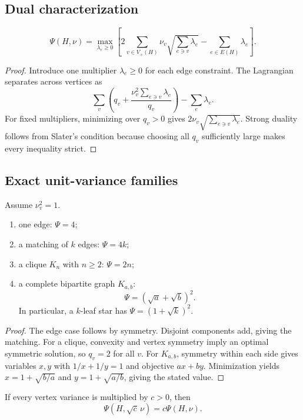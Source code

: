 \subsection{Dual characterization}

\begin{theorem}
\label{thm:dual}
\[
\Psi(H,\nu)
=
\max_{\lambda_e\ge0}
\left[
2\sum_{v\in V_+(H)}\nu_v
\sqrt{\sum_{e\ni v}\lambda_e}
-
\sum_{e\in E(H)}\lambda_e
\right].
\]
\end{theorem}

\begin{proof}
Introduce one multiplier $\lambda_e\ge0$ for each edge constraint.  The Lagrangian
separates across vertices as
\[
\sum_v\left(q_v+
\frac{\nu_v^2\sum_{e\ni v}\lambda_e}{q_v}\right)-\sum_e\lambda_e.
\]
For fixed multipliers, minimizing over $q_v>0$ gives
$2\nu_v\sqrt{\sum_{e\ni v}\lambda_e}$.  Strong duality follows from Slater's
condition because choosing all $q_v$ sufficiently large makes every inequality
strict.
\end{proof}

\subsection{Exact unit-variance families}
Assume $\nu_v^2=1$.

\begin{proposition}
\label{prop:families}
\begin{enumerate}[label=(\roman*)]
\item one edge: $\Psi=4$;
\item a matching of $k$ edges: $\Psi=4k$;
\item a clique $K_n$ with $n\ge2$: $\Psi=2n$;
\item a complete bipartite graph $K_{a,b}$:
\[
\Psi=(\sqrt a+\sqrt b)^2.
\]
In particular, a $k$-leaf star has $\Psi=(1+\sqrt{k})^2$.
\end{enumerate}
\end{proposition}

\begin{proof}
The edge case follows by symmetry.  Disjoint components add, giving the matching.
For a clique, convexity and vertex symmetry imply an optimal symmetric solution,
so $q_v=2$ for all $v$.  For $K_{a,b}$, symmetry within each side gives variables
$x,y$ with $1/x+1/y=1$ and objective $ax+by$.  Minimization yields
$x=1+\sqrt{b/a}$ and $y=1+\sqrt{a/b}$, giving the stated value.
\end{proof}

\begin{corollary}
If every vertex variance is multiplied by $c>0$, then
\[
\Psi(H,\sqrt c\,\nu)=c\Psi(H,\nu).
\]
\end{corollary}
